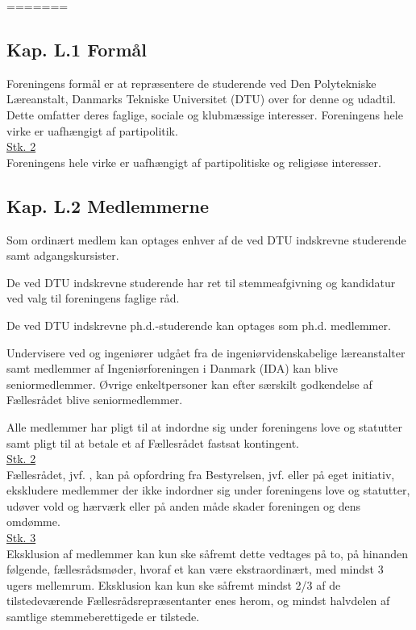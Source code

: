 \begin{list}
=======
\subsection{Kap. L.1 Formål}\label{L:kap:Formaal}
\item Foreningens formål er at repræsentere de studerende ved Den Polytekniske Læreanstalt, Danmarks Tekniske Universitet (DTU) over for denne og udadtil. Dette omfatter deres faglige, sociale og klubmæssige interesser. Foreningens hele virke er uafhængigt af partipolitik.\\

\underline{Stk. 2} \\
Foreningens hele virke er uafhængigt af partipolitiske og religiøse interesser.

\subsection*{Kap. L.2 Medlemmerne}
\label{L:kap:medlemmerne}
\item Som ordinært medlem kan optages enhver af de ved DTU indskrevne studerende samt adgangskursister.
\item De ved DTU indskrevne studerende har ret til stemmeafgivning og kandidatur ved valg til foreningens faglige råd.
\item De ved DTU indskrevne ph.d.-studerende kan optages som ph.d. medlemmer.

\item Undervisere ved og ingeniører udgået fra de ingeniørvidenskabelige læreanstalter samt medlemmer af         Ingeniørforeningen i Danmark (IDA) kan blive seniormedlemmer. Øvrige enkeltpersoner kan efter særskilt godkendelse af Fællesrådet blive seniormedlemmer.
\item \label{L:Medlem:Pligt} Alle medlemmer har pligt til at indordne sig under foreningens love og statutter samt pligt til at betale et af Fællesrådet fastsat kontingent.\\

\underline{Stk. 2} \\
Fællesrådet, jvf. , kan på opfordring fra Bestyrelsen, jvf.  eller på eget initiativ, ekskludere medlemmer der ikke indordner sig under foreningens love og statutter, udøver vold og hærværk eller på anden måde skader foreningen og dens omdømme.\\

\underline{Stk. 3}\\
Eksklusion af medlemmer kan kun ske såfremt dette vedtages på to, på hinanden følgende, fællesrådsmøder, hvoraf et kan være ekstraordinært, med mindst 3 ugers mellemrum. Eksklusion kan kun ske såfremt mindst 2/3 af de tilstedeværende Fællesrådsrepræsentanter enes herom, og mindst halvdelen af
samtlige stemmeberettigede er tilstede.\\


\end{list}
